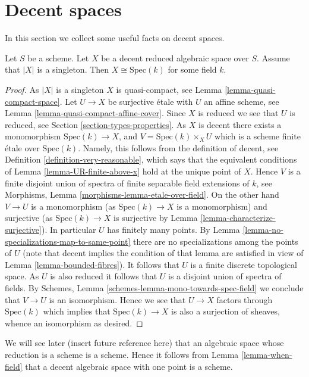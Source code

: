 \section{Decent spaces}
\label{section-decent}

\noindent
In this section we collect some useful facts on decent spaces.

\begin{lemma}
\label{lemma-when-field}
Let $S$ be a scheme.
Let $X$ be a decent reduced algebraic space over $S$.
Assume that $|X|$ is a singleton.
Then $X \cong \text{Spec}(k)$ for some field $k$.
\end{lemma}

\begin{proof}
As $|X|$ is a singleton $X$ is quasi-compact, see
Lemma \ref{lemma-quasi-compact-space}.
Let $U \to X$ be surjective \'etale with $U$ an affine scheme, see
Lemma \ref{lemma-quasi-compact-affine-cover}.
Since $X$ is reduced we see that $U$ is reduced, see
Section \ref{section-types-properties}.
As $X$ is decent there exists a monomorphism $\text{Spec}(k) \to X$,
and $V = \text{Spec}(k) \times_X U$ which is a scheme finite \'etale
over $\text{Spec}(k)$. Namely, this
follows from the definition of decent, see
Definition \ref{definition-very-reasonable},
which says that the equivalent conditions of
Lemma \ref{lemma-UR-finite-above-x}
hold at the unique point of $X$. Hence $V$ is a finite disjoint union of
spectra of finite separable field extensions of $k$, see
Morphisms, Lemma \ref{morphisms-lemma-etale-over-field}.
On the other hand $V \to U$ is a monomorphism (as $\text{Spec}(k) \to X$
is a monomorphism) and surjective (as $\text{Spec}(k) \to X$ is surjective by
Lemma \ref{lemma-characterize-surjective}).
In particular $U$ has finitely many points.
By Lemma \ref{lemma-no-specializations-map-to-same-point}
there are no specializations among the points of $U$ (note that decent
implies the condition of that lemma are satisfied in view of
Lemma \ref{lemma-bounded-fibres}).
It follows that $U$ is a finite discrete topological space.
As $U$ is also reduced it follows that $U$ is a disjoint union
of spectra of fields. By
Schemes, Lemma \ref{schemes-lemma-mono-towards-spec-field}
we conclude that $V \to U$ is an isomorphism. Hence we see that
$U \to X$ factors through $\text{Spec}(k)$ which implies that
$\text{Spec}(k) \to X$ is also a surjection of sheaves, whence
an isomorphism as desired.
\end{proof}

\begin{remark}
\label{remark-one-point-decent-scheme}
We will see later (insert future reference here) that an algebraic space whose
reduction is a scheme is a scheme. Hence it follows from 
Lemma \ref{lemma-when-field}
that a decent algebraic space with one point is a scheme.
\end{remark}




